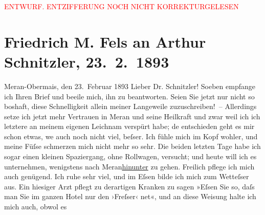 
\begin{center}
            \textcolor{red}{ENTWURF. ENTZIFFERUNG NOCH NICHT KORREKTURGELESEN}
                      \end{center}
            
               \section[Friedrich M. Fels an Arthur Schnitzler, 23. 2. 1893]{ Friedrich M. Fels an Arthur Schnitzler, 23. 2. 1893}\nopagebreak{}\rehead{ }\begin{ledgroupsized}[t]{13cm}\normalsize\beginnumbering{} \toendnotes[C]{\smallbreak\pagebreak[2]} 
\toendnotes[C]{\smallbreak}\pstart
           \raggedleft{}{\pb}Meran-Obermais, den 23. Februar
                     1893\pend
           \pstart\center{}Lieber Dr. Schnitzler!\pend\pstart
           Soeben empfange ich Ihren Brief und beeile mich, ihn zu beantworten. Seien Sie jetzt
               nur nicht so boshaft, diese Schnelligkeit allein meiner Langeweile
               zuzuschreiben! –\pend
           \pstart
           Allerdings setze ich jetzt mehr Vertrauen in Meran
               und seine Heilkraft und zwar weil ich ich letztere an meinem eigenen Leichnam
               verspürt habe; de{\geminationn} entschieden geht es mir schon etwas,
                  we{\geminationn} auch noch nicht viel, beſser. Ich fühle mich im
               Kopf wohler, und meine Füſse schmerzen mich nicht mehr so sehr. Die beiden letzten
               Tage habe ich sogar einen kleinen Spaziergang, ohne Rollwagen, versucht; und heute
               will ich es unternehmen, wenigstens nach Meran\uline{hinunter} zu gehen.\pend
           \pstart
           Freilich pflege ich mich auch genügend. Ich ruhe sehr viel, und im Eſsen bilde ich
               mich zum Wetteſser aus. Ein hiesiger Arzt pflegt zu derartigen Kranken zu sagen
               »Eſsen Sie so, daſs man Sie im ganzen Hotel nur den ›Freſser‹ ne{\geminationn}t«, und an diese Weisung halte ich mich auch, obwol es

\end{ledgroupsized}

